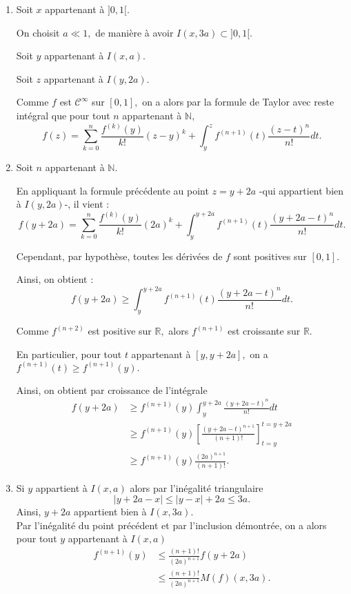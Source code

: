 \begin{enumerate}
\item Soit $x$ appartenant \`{a} $]0,1[.$ 

On choisit $a\ll 1,$ de manière à avoir $I(x,3a)\subset ]0,1[.$

Soit $y$ appartenant \`{a} $I(x,a).$ 

Soit $z$ appartenant \`{a} $I(y,2a).$

Comme $f$ est $\mathcal{C}^{\infty}$ sur $[0,1],$ on a alors par la formule de Taylor avec reste int\'{e}gral que pour tout $n$ appartenant \`{a} $\mathbb{N},$ $$f(z)=\sum_{k=0}^{n}\frac{f^{(k)}(y)}{k!}(z-y)^{k}+\int_{y}^{z}f^{(n+1)}(t)\frac{(z-t)^{n}}{n!}dt.$$

\item Soit $n$ appartenant \`{a} $\mathbb{N}.$ 

En appliquant la formule pr\'{e}c\'{e}dente au point $z=y+2a$ -qui appartient bien \`{a} $I(y,2a)$-, il vient : 
$$f(y+2a) = \sum_{k=0}^{n}\frac{f^{(k)}(y)}{k!}(2a)^{k}+\int_{y}^{y+2a}f^{(n+1)}(t)\frac{(y+2a-t)^{n}}{n!}dt.$$

Cependant, par hypoth\`{e}se, toutes les d\'{e}riv\'{e}es de $f$ sont positives sur $[0,1].$ 

Ainsi, on obtient :  $$f(y+2a)\geq\int_{y}^{y+2a}f^{(n+1)}(t)\frac{(y+2a-t)^{n}}{n!}dt.$$

Comme $f^{(n+2)}$ est positive sur $\mathbb{R},$ alors $f^{(n+1)}$ est croissante sur $\mathbb{R}.$ 

En particulier, pour tout $t$ appartenant \`{a} $[y,y+2a],$ on a $\displaystyle f^{(n+1)}(t)\geq f^{(n+1)}(y).$ 

Ainsi, on obtient par croissance de l'int\'{e}grale 
\begin{align*}
f(y+2a) & \geq f^{(n+1)}(y)\int_{y}^{y+2a}\frac{(y+2a-t)^{n}}{n!}dt\\
& \geq f^{(n+1)}(y)\left[\frac{(y+2a-t)^{n+1}}{(n+1)!}\right]_{t=y}^{t=y+2a}\\
& \geq f^{(n+1)}(y)\frac{(2a)^{n+1}}{(n+1)!}.
\end{align*}

\item Si $y$ appartient \`{a} $I(x,a)$ alors par l'in\'{e}galit\'{e} triangulaire $$\vert y+2a-x \vert \leq \vert y-x \vert +2a \leq 3a.$$ Ainsi, $y+2a$ appartient bien \`{a} $I(x,3a).$ 
\\

Par l'in\'{e}galit\'{e} du point pr\'{e}c\'{e}dent et par l'inclusion d\'{e}montr\'{e}e, on a alors pour tout $y$ appartenant \`{a} $I(x,a)$ 
\begin{align*}
f^{(n+1)}(y) & \leq \frac{(n+1)!}{(2a)^{n+1}}f(y+2a)\\
& \leq \frac{(n+1)!}{(2a)^{n+1}}M(f)(x,3a).
\end{align*}


\end{enumerate}
